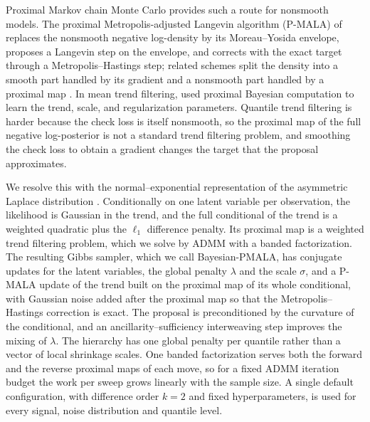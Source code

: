 Proximal Markov chain Monte Carlo provides such a route for nonsmooth models. The proximal Metropolis-adjusted Langevin algorithm (P-MALA) of \citet{pereyra2016proximal} replaces the nonsmooth negative log-density by its Moreau--Yosida envelope, proposes a Langevin step on the envelope, and corrects with the exact target through a Metropolis--Hastings step; related schemes split the density into a smooth part handled by its gradient and a nonsmooth part handled by a proximal map \citep{durmus2018efficient}. In mean trend filtering, \citet{heng2023bayesian} used proximal Bayesian computation to learn the trend, scale, and regularization parameters. Quantile trend filtering is harder because the check loss is itself nonsmooth, so the proximal map of the full negative log-posterior is not a standard trend filtering problem, and smoothing the check loss to obtain a gradient changes the target that the proposal approximates.

We resolve this with the normal--exponential representation of the asymmetric Laplace distribution \citep{kozumi2011gibbs}. Conditionally on one latent variable per observation, the likelihood is Gaussian in the trend, and the full conditional of the trend is a weighted quadratic plus the $\ell_1$ difference penalty. Its proximal map is a weighted trend filtering problem, which we solve by ADMM with a banded factorization. The resulting Gibbs sampler, which we call Bayesian-PMALA, has conjugate updates for the latent variables, the global penalty $\lambda$ and the scale $\sigma$, and a P-MALA update of the trend built on the proximal map of its whole conditional, with Gaussian noise added after the proximal map so that the Metropolis--Hastings correction is exact. The proposal is preconditioned by the curvature of the conditional, and an ancillarity--sufficiency interweaving step \citep{yu2011center} improves the mixing of $\lambda$. The hierarchy has one global penalty per quantile rather than a vector of local shrinkage scales. One banded factorization serves both the forward and the reverse proximal maps of each move, so for a fixed ADMM iteration budget the work per sweep grows linearly with the sample size. A single default configuration, with difference order $k=2$ and fixed hyperparameters, is used for every signal, noise distribution and quantile level.

